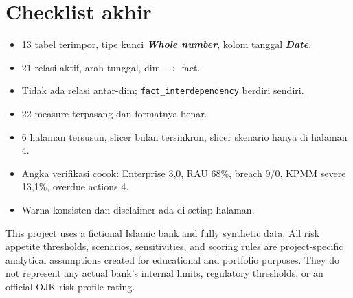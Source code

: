 \documentclass[11pt,a4paper]{article}
\newcommand{\file}[1]{\texttt{\small #1}}
\newcommand{\ui}[1]{\textbf{\textit{#1}}}
\begin{document}
\section{Checklist akhir}

\begin{itemize}
\item[$\square$] 13 tabel terimpor, tipe kunci \ui{Whole number}, kolom tanggal \ui{Date}.
\item[$\square$] 21 relasi aktif, arah tunggal, dim $\rightarrow$ fact.
\item[$\square$] Tidak ada relasi antar-dim; \file{fact\_interdependency} berdiri sendiri.
\item[$\square$] 22 measure terpasang dan formatnya benar.
\item[$\square$] 6 halaman tersusun, slicer bulan tersinkron, slicer skenario hanya di halaman 4.
\item[$\square$] Angka verifikasi cocok: Enterprise 3{,}0, RAU 68\%, breach 9/0, KPMM severe 13{,}1\%, overdue actions 4.
\item[$\square$] Warna konsisten dan disclaimer ada di setiap halaman.
\end{itemize}

\vspace{0.6em}
\begin{tcolorbox}[colback=softgrey,colframe=navy,boxrule=0.6pt,arc=2pt,title=Disclaimer,fonttitle=\bfseries]
\small This project uses a fictional Islamic bank and fully synthetic data. All risk appetite thresholds, scenarios, sensitivities, and scoring rules are project-specific analytical assumptions created for educational and portfolio purposes. They do not represent any actual bank's internal limits, regulatory thresholds, or an official OJK risk profile rating.
\end{tcolorbox}
\end{document}
